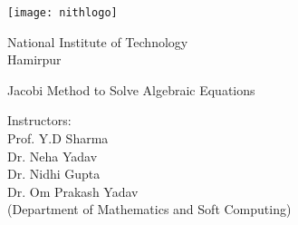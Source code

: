 \documentclass[main.tex]{subfiles}
\begin{document}
    \begin{center}
    \texttt{[image: nithlogo]}

    {\huge National Institute of Technology \\
    Hamirpur \\}

    \vspace{50mm}
    
    {\LARGE Jacobi Method to Solve Algebraic Equations}

    \vspace{35mm}
    Instructors: \\
    \vspace{1mm}
    Prof. Y.D Sharma\\
    \vspace{1mm}
    Dr. Neha Yadav\\
    \vspace{1mm}
    Dr. Nidhi Gupta\\ 
    \vspace{1mm}
    Dr. Om Prakash Yadav 
    \vspace{2mm}
    \\ (Department of Mathematics and Soft Computing)
    \end{center}
\end{document}
